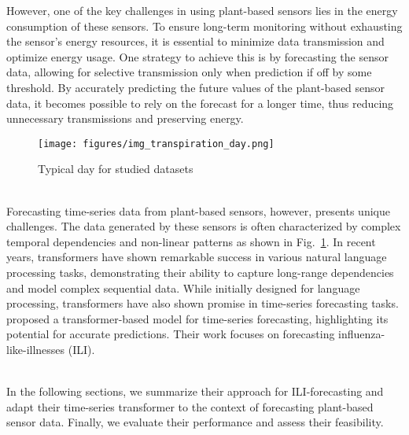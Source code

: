 \documentclass[11pt,a4paper]{article}
\begin{document}
However, one of the key challenges in using plant-based sensors lies in the energy consumption of these sensors. 
To ensure long-term monitoring without exhausting the sensor's energy resources, it is essential to minimize data transmission and optimize energy usage. 
One strategy to achieve this is by forecasting the sensor data, allowing for selective transmission only when prediction if off by some threshold. 
By accurately predicting the future values of the plant-based sensor data, it becomes possible to rely on the forecast for a longer time, thus reducing unnecessary transmissions and preserving energy.
\begin{figure}%
    \centering
    \texttt{[image: figures/img\_transpiration\_day.png]}
    \caption{Typical day for studied datasets}
    \label{fig:example_datasets}
\end{figure}
~\\
Forecasting time-series data from plant-based sensors, however, presents unique challenges. 
The data generated by these sensors is often characterized by complex temporal dependencies and non-linear patterns as shown in Fig.~\ref{fig:example_datasets}. 
In recent years, transformers have shown remarkable success in various natural language processing tasks, demonstrating their ability to capture long-range dependencies and model complex sequential data. 
While initially designed for language processing, transformers have also shown promise in time-series forecasting tasks. \citet{wu_2020} proposed a transformer-based model for time-series forecasting, highlighting its potential for accurate predictions.
Their work focuses on forecasting influenza-like-illnesses (ILI).

~\\
In the following sections, we summarize their approach for ILI-forecasting and adapt their time-series transformer to the context of forecasting plant-based sensor data.
Finally, we evaluate their performance and assess their feasibility.

\end{document}
